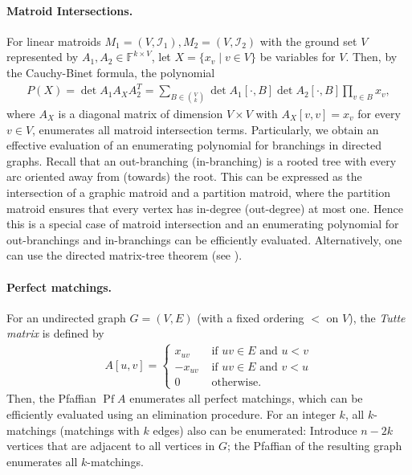 \documentclass[10pt,a4paper]{article}
\newcommand{\F}{\ensuremath{\mathbb F}\xspace}
\newcommand{\cI}{\ensuremath{\mathcal I}\xspace}
\DeclareMathOperator{\Pf}{Pf}
\begin{document}
\paragraph*{Matroid Intersections.}
For linear matroids $M_1 = (V, \cI_1), M_2 = (V, \cI_2)$ with the ground set $V$ represented by $A_1, A_2 \in \F^{k \times V}$, let $X = \{ x_v \mid v \in V \}$ be variables for $V$.
Then, by the Cauchy-Binet formula, the polynomial
\begin{align*}
  P(X) = \det A_1 A_X A_2^T = \sum_{B \in \binom{V}{k}} \det A_1[\cdot, B] \det A_2[\cdot, B] \prod_{v \in B} x_v,
\end{align*}
where $A_X$ is a diagonal matrix of dimension $V \times V$ with $A_X[v, v] = x_v$ for every $v \in V$, enumerates all matroid intersection terms.
Particularly, we obtain an effective evaluation of an enumerating polynomial for branchings in directed graphs.
Recall that an out-branching (in-branching) is a rooted tree with every arc oriented away from (towards) the root.
This can be expressed as the intersection of a graphic matroid and a partition matroid, where the partition matroid ensures that every vertex has in-degree (out-degree) at most one.
Hence this is a special case of matroid intersection and an enumerating polynomial for out-branchings and in-branchings can be efficiently evaluated.
Alternatively, one can use the directed matrix-tree theorem (see \cite{BjorklundKK17directed,gessel95algebraic}).

\paragraph*{Perfect matchings.}
For an undirected graph $G = (V, E)$ (with a fixed ordering $<$ on $V$), the \emph{Tutte matrix} is defined by
\begin{align*}
  A[u,v] = \begin{cases}
    x_{uv} & \text{ if } uv \in E \text{ and } u < v \\
    -x_{uv} & \text{ if } uv \in E \text{ and } v < u \\
    0 & \text{ otherwise}.
  \end{cases}
\end{align*}
Then, the Pfaffian $\Pf A$ enumerates all perfect matchings, which can be efficiently evaluated using an elimination procedure.
For an integer $k$, all $k$-matchings (matchings with $k$ edges) also can be enumerated: Introduce $n - 2k$ vertices that are adjacent to all vertices in $G$; the Pfaffian of the resulting graph enumerates all $k$-matchings.
\end{document}

